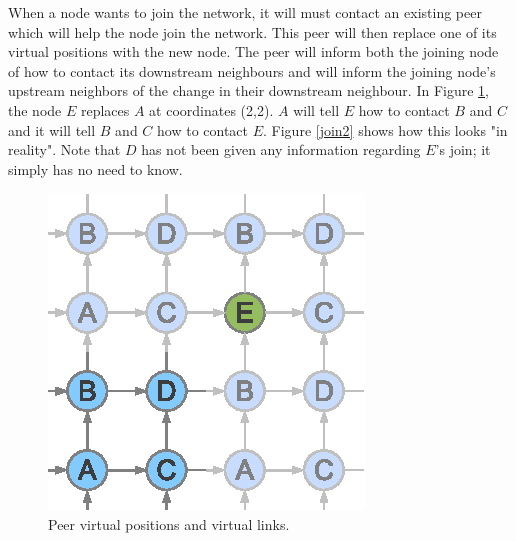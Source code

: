 \documentclass[ %
                    author={Luke Murray},
                supervisor={Dr. Simon Hollis},
                     title={Shadow Peer-to-Peer Networks},
                  subtitle={},
                    degree={MEng},
                      year={2013} ]{thesis}
\begin{document}
When a node wants to join the network, it will must contact an existing peer which will help the node join the network. This peer will then replace one of its virtual positions with the new node. The peer will inform both the joining node of how to contact its downstream neighbours and will inform the joining node's upstream neighbors of the change in their downstream neighbour. In Figure \ref{join1}, the node $E$ replaces $A$ at coordinates (2,2). $A$ will tell $E$ how to contact $B$ and $C$ and it will tell $B$ and $C$ how to contact $E$. Figure \ref{join2} shows how this looks "in reality". Note that $D$ has not been given any information regarding $E$'s join; it simply has no need to know.

\begin{figure}[h]%
    \centering
    \begin{minipage}[b]{0.35\linewidth}
        \centering
        \includegraphics[width=\linewidth]{diagrams/network_join1.eps}
        \caption{Peer virtual positions and virtual links.}
        \label{join1}
    \end{minipage}
    \hspace{0.5cm}
    \begin{minipage}[b]{0.35\linewidth}
        \centering

\end{minipage}
\end{figure}
\end{document}

